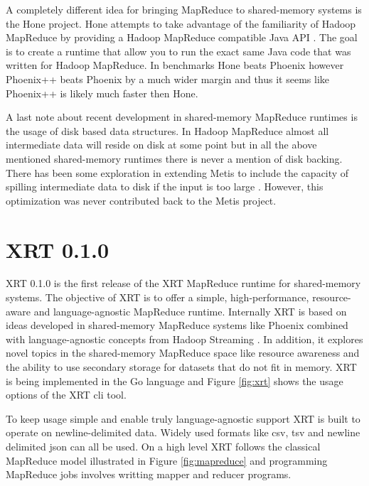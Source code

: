 \documentclass[twocolumn,11px]{article}       %
\begin{document}
A completely different idea for bringing MapReduce to shared-memory systems is
the Hone project. Hone attempts to take advantage of the familiarity of Hadoop
MapReduce by providing a Hadoop MapReduce compatible Java API
\cite{ScalingDown}. The goal is to create a runtime that allow you to run the
exact same Java code that was written for Hadoop MapReduce. In benchmarks Hone
beats Phoenix however Phoenix++ beats Phoenix by a much wider margin and thus it
seems like Phoenix++ is likely much faster then Hone.

A last note about recent development in shared-memory MapReduce runtimes is the
usage of disk based data structures. In Hadoop MapReduce almost all intermediate
data will reside on disk at some point but in all the above mentioned
shared-memory runtimes there is never a mention of disk backing. There has been
some exploration in extending Metis to include the capacity of spilling
intermediate data to disk if the input is too large \cite{DiskOptimization}.
However, this optimization was never contributed back to the Metis project.

\section{XRT 0.1.0} \label{sec:xrt}

XRT 0.1.0 is the first release of the XRT MapReduce runtime for shared-memory systems.
The objective of XRT is to offer a simple, high-performance, resource-aware and language-agnostic MapReduce runtime.
Internally XRT is based on ideas developed in shared-memory MapReduce systems like Phoenix \cite{Phoenix} combined with language-agnostic concepts from Hadoop Streaming \cite{HadoopStreaming}.
In addition, it explores novel topics in the shared-memory MapReduce space like resource awareness and the ability to use secondary storage for datasets that do not fit in memory.
XRT is being implemented in the Go language and Figure \ref{fig:xrt} shows the usage options of the XRT cli tool.

To keep usage simple and enable truly language-agnostic support XRT is built to operate on newline-delimited data.
Widely used formats like csv, tsv and newline delimited json can all be used.
On a high level XRT follows the classical MapReduce model illustrated in Figure \ref{fig:mapreduce} and programming MapReduce jobs involves writting mapper and reducer programs.
\end{document}
